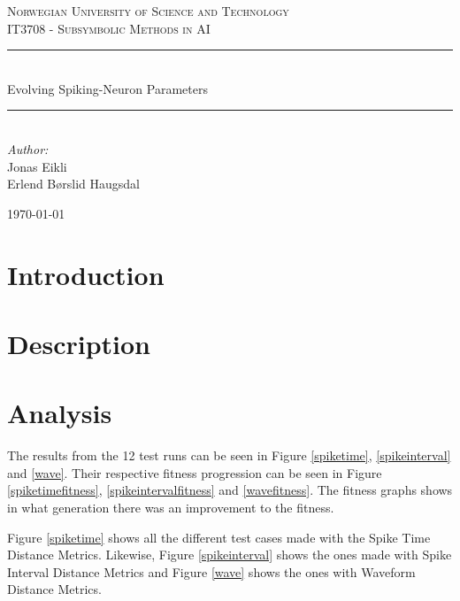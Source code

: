 \documentclass[12pt, a4paper, oneside, titlepage]{article}
\newcommand{\HRule}{\rule{\linewidth}{0.5mm}}
\begin{document}
\begin{titlepage}
\begin{center}
\thispagestyle{empty}

\textsc{\large Norwegian University of Science and Technology} \\
\textsc{IT3708 - Subsymbolic Methods in AI} \\[3cm]
\HRule\\[0.5cm]
{\Huge Evolving Spiking-Neuron Parameters}\\[0.5cm]
\HRule\\[3.5cm]

{\large \emph{Author:}}\\
Jonas Eikli\\
Erlend B\o rslid Haugsdal

\vfill

{\large \today}


\end{center}
\end{titlepage}




\tableofcontents

\newpage

\section{Introduction}


\section{Description}



\section{Analysis}

The results from the 12 test runs can be seen in Figure \ref{spiketime}, \ref{spikeinterval} and \ref{wave}. Their respective fitness progression can be seen in Figure \ref{spiketimefitness}, \ref{spikeintervalfitness} and \ref{wavefitness}. The fitness graphs shows in what generation there was an improvement to the fitness.

Figure \ref{spiketime} shows all the different test cases made with the Spike Time Distance Metrics. Likewise, Figure \ref{spikeinterval} shows the ones made with Spike Interval Distance Metrics and Figure \ref{wave} shows the ones with Waveform Distance Metrics. 
\end{document}
